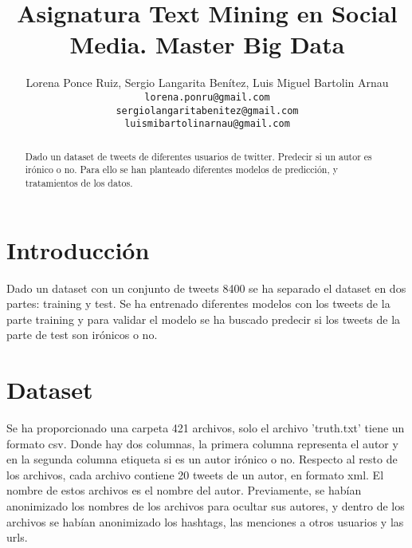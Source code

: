 \documentclass[11pt,a4paper]{article}
\title{Asignatura Text Mining en Social Media. Master Big Data}
\author{Lorena Ponce Ruiz, Sergio Langarita Benítez, Luis Miguel Bartolin Arnau \\
  {\tt lorena.ponru@gmail.com} \\
  {\tt sergiolangaritabenitez@gmail.com} \\
  {\tt luismibartolinarnau@gmail.com} \\}
\date{}
\begin{document}
\maketitle
\begin{abstract}
Dado un dataset de tweets de diferentes usuarios de twitter. Predecir si un autor es irónico o no. Para ello se han planteado diferentes modelos de predicción, y tratamientos de los datos.
\end{abstract}


\section{Introducción}


Dado un dataset con un conjunto de tweets 8400 se ha separado el dataset en dos partes: training y test. Se ha entrenado diferentes modelos con los tweets de la parte training y para validar el modelo se ha buscado predecir si los tweets de la parte de test son irónicos o no.





 




\section{Dataset}

Se ha proporcionado una carpeta 421 archivos, solo el archivo 'truth.txt' tiene un formato csv. Donde hay dos columnas, la primera columna representa el autor y en la segunda columna etiqueta si es un autor irónico o no. Respecto al resto de los archivos, cada archivo contiene 20 tweets de un autor, en formato xml. El nombre de estos archivos es el nombre del autor. Previamente, se habían anonimizado los nombres de los archivos para ocultar sus autores, y dentro de los archivos se habían anonimizado los hashtags, las menciones a otros usuarios y las urls.


\end{document}
